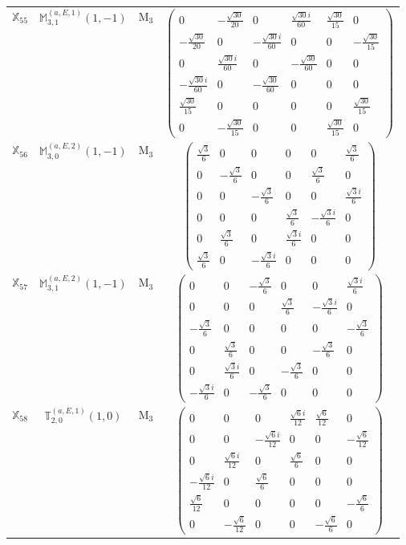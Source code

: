 \documentclass[fleqn,10pt,landscape]{article}
\begin{document}
\begin{itemize}
\begin{center}
\begin{longtable}{c|c|c|c}
$ \mathbb{X}_{55} $ & $\mathbb{M}_{3,1}^{(a,E,1)}(1,-1)$ & M$_{3}$ & $\begin{pmatrix} 0 & - \frac{\sqrt{30}}{20} & 0 & \frac{\sqrt{30} i}{60} & \frac{\sqrt{30}}{15} & 0 \\ - \frac{\sqrt{30}}{20} & 0 & - \frac{\sqrt{30} i}{60} & 0 & 0 & - \frac{\sqrt{30}}{15} \\ 0 & \frac{\sqrt{30} i}{60} & 0 & - \frac{\sqrt{30}}{60} & 0 & 0 \\ - \frac{\sqrt{30} i}{60} & 0 & - \frac{\sqrt{30}}{60} & 0 & 0 & 0 \\ \frac{\sqrt{30}}{15} & 0 & 0 & 0 & 0 & \frac{\sqrt{30}}{15} \\ 0 & - \frac{\sqrt{30}}{15} & 0 & 0 & \frac{\sqrt{30}}{15} & 0 \end{pmatrix}$ \\
$ \mathbb{X}_{56} $ & $\mathbb{M}_{3,0}^{(a,E,2)}(1,-1)$ & M$_{3}$ & $\begin{pmatrix} \frac{\sqrt{3}}{6} & 0 & 0 & 0 & 0 & \frac{\sqrt{3}}{6} \\ 0 & - \frac{\sqrt{3}}{6} & 0 & 0 & \frac{\sqrt{3}}{6} & 0 \\ 0 & 0 & - \frac{\sqrt{3}}{6} & 0 & 0 & \frac{\sqrt{3} i}{6} \\ 0 & 0 & 0 & \frac{\sqrt{3}}{6} & - \frac{\sqrt{3} i}{6} & 0 \\ 0 & \frac{\sqrt{3}}{6} & 0 & \frac{\sqrt{3} i}{6} & 0 & 0 \\ \frac{\sqrt{3}}{6} & 0 & - \frac{\sqrt{3} i}{6} & 0 & 0 & 0 \end{pmatrix}$ \\
$ \mathbb{X}_{57} $ & $\mathbb{M}_{3,1}^{(a,E,2)}(1,-1)$ & M$_{3}$ & $\begin{pmatrix} 0 & 0 & - \frac{\sqrt{3}}{6} & 0 & 0 & \frac{\sqrt{3} i}{6} \\ 0 & 0 & 0 & \frac{\sqrt{3}}{6} & - \frac{\sqrt{3} i}{6} & 0 \\ - \frac{\sqrt{3}}{6} & 0 & 0 & 0 & 0 & - \frac{\sqrt{3}}{6} \\ 0 & \frac{\sqrt{3}}{6} & 0 & 0 & - \frac{\sqrt{3}}{6} & 0 \\ 0 & \frac{\sqrt{3} i}{6} & 0 & - \frac{\sqrt{3}}{6} & 0 & 0 \\ - \frac{\sqrt{3} i}{6} & 0 & - \frac{\sqrt{3}}{6} & 0 & 0 & 0 \end{pmatrix}$ \\
$ \mathbb{X}_{58} $ & $\mathbb{T}_{2,0}^{(a,E,1)}(1,0)$ & M$_{3}$ & $\begin{pmatrix} 0 & 0 & 0 & \frac{\sqrt{6} i}{12} & \frac{\sqrt{6}}{12} & 0 \\ 0 & 0 & - \frac{\sqrt{6} i}{12} & 0 & 0 & - \frac{\sqrt{6}}{12} \\ 0 & \frac{\sqrt{6} i}{12} & 0 & \frac{\sqrt{6}}{6} & 0 & 0 \\ - \frac{\sqrt{6} i}{12} & 0 & \frac{\sqrt{6}}{6} & 0 & 0 & 0 \\ \frac{\sqrt{6}}{12} & 0 & 0 & 0 & 0 & - \frac{\sqrt{6}}{6} \\ 0 & - \frac{\sqrt{6}}{12} & 0 & 0 & - \frac{\sqrt{6}}{6} & 0 \end{pmatrix}$ \\

\end{longtable}
\end{center}
\end{itemize}
\end{document}
